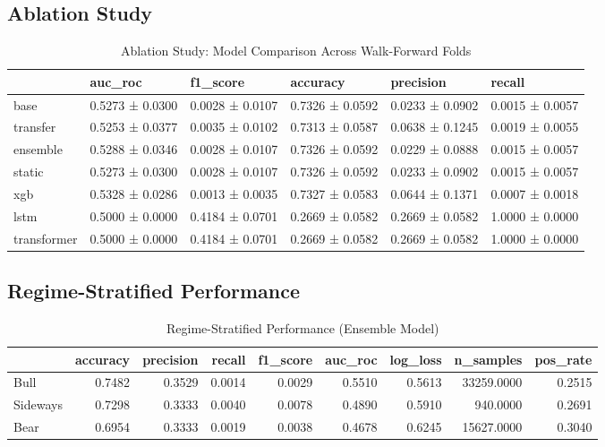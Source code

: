 \documentclass[12pt,a4paper]{article}
\begin{document}
\subsection{Ablation Study}

\begin{table}
\caption{Ablation Study: Model Comparison Across Walk-Forward Folds}
\label{tab:ablation}
\begin{tabular}{llllll}
\toprule
 & auc_roc & f1_score & accuracy & precision & recall \\
\midrule
base & 0.5273 ± 0.0300 & 0.0028 ± 0.0107 & 0.7326 ± 0.0592 & 0.0233 ± 0.0902 & 0.0015 ± 0.0057 \\
transfer & 0.5253 ± 0.0377 & 0.0035 ± 0.0102 & 0.7313 ± 0.0587 & 0.0638 ± 0.1245 & 0.0019 ± 0.0055 \\
ensemble & 0.5288 ± 0.0346 & 0.0028 ± 0.0107 & 0.7326 ± 0.0592 & 0.0229 ± 0.0888 & 0.0015 ± 0.0057 \\
static & 0.5273 ± 0.0300 & 0.0028 ± 0.0107 & 0.7326 ± 0.0592 & 0.0233 ± 0.0902 & 0.0015 ± 0.0057 \\
xgb & 0.5328 ± 0.0286 & 0.0013 ± 0.0035 & 0.7327 ± 0.0583 & 0.0644 ± 0.1371 & 0.0007 ± 0.0018 \\
lstm & 0.5000 ± 0.0000 & 0.4184 ± 0.0701 & 0.2669 ± 0.0582 & 0.2669 ± 0.0582 & 1.0000 ± 0.0000 \\
transformer & 0.5000 ± 0.0000 & 0.4184 ± 0.0701 & 0.2669 ± 0.0582 & 0.2669 ± 0.0582 & 1.0000 ± 0.0000 \\
\bottomrule
\end{tabular}
\end{table}


\subsection{Regime-Stratified Performance}

\begin{table}
\caption{Regime-Stratified Performance (Ensemble Model)}
\label{tab:regime}
\begin{tabular}{lrrrrrrrr}
\toprule
 & accuracy & precision & recall & f1_score & auc_roc & log_loss & n_samples & pos_rate \\
\midrule
Bull & 0.7482 & 0.3529 & 0.0014 & 0.0029 & 0.5510 & 0.5613 & 33259.0000 & 0.2515 \\
Sideways & 0.7298 & 0.3333 & 0.0040 & 0.0078 & 0.4890 & 0.5910 & 940.0000 & 0.2691 \\
Bear & 0.6954 & 0.3333 & 0.0019 & 0.0038 & 0.4678 & 0.6245 & 15627.0000 & 0.3040 \\
\bottomrule
\end{tabular}
\end{table}
\end{document}
